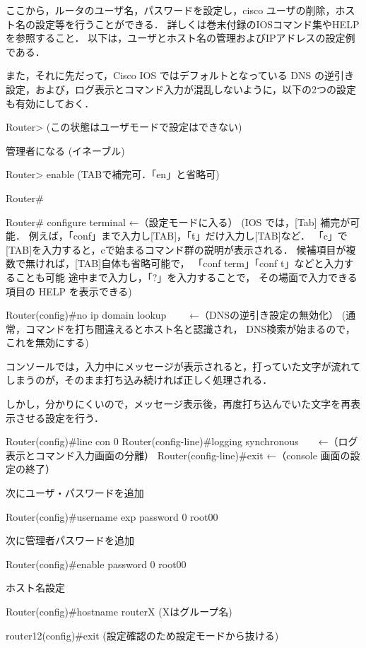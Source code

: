 ここから，ルータのユーザ名，パスワードを設定し，cisco ユーザの削除，ホスト名の設定等を行うことができる．
詳しくは巻末付録のIOSコマンド集やHELPを参照すること．
以下は，ユーザとホスト名の管理およびIPアドレスの設定例である．

また，それに先だって，Cisco IOS ではデフォルトとなっている DNS の逆引き
設定，および，ログ表示とコマンド入力が混乱しないように，以下の2つの設定
も有効にしておく．
\clearpage

\begin{cli}

Router>
(この状態はユーザモードで設定はできない)

管理者になる (イネーブル)

Router> enable
(TABで補完可．「en」と省略可)

Router#

Router# configure terminal                                 ←（設定モードに入る）
  (IOS では，[Tab] 補完が可能．
   例えば，「conf」まで入力し[TAB]，「t」だけ入力し[TAB]など．
    「c」で[TAB]を入力すると，cで始まるコマンド群の説明が表示される．
   候補項目が複数で無ければ，[TAB]自体も省略可能で，
   「conf term」「conf t」などと入力することも可能
   途中まで入力し，「?」を入力することで，
   その場面で入力できる項目の HELP を表示できる)

Router(config)#no ip domain lookup　　               ←（DNSの逆引き設定の無効化）
  (通常，コマンドを打ち間違えるとホスト名と認識され，
  DNS検索が始まるので，これを無効にする)
  
コンソールでは，入力中にメッセージが表示されると，打っていた文字が流れてしまうのが，そのまま打ち込み続ければ正しく処理される．

しかし，分かりにくいので，メッセージ表示後，再度打ち込んでいた文字を再表示させる設定を行う．
  
Router(config)#line con 0   
Router(config-line)#logging synchronous　　←（ログ表示とコマンド入力画面の分離）
Router(config-line)#exit       ←（console 画面の設定の終了）

次にユーザ・パスワードを追加

Router(config)#username exp password 0 root00

次に管理者パスワードを追加

Router(config)#enable password 0 root00

ホスト名設定

Router(config)#hostname routerX  (Xはグループ名)  

router12(config)#exit  (設定確認のため設定モードから抜ける)


\end{cli}
